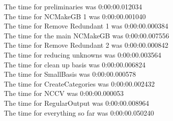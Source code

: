 \documentclass[rep10,leqno]{report}
\begin{document}
\noindent
The time for preliminaries was 0:00:00.012034\\
The time for NCMakeGB 1 was 0:00:00.001040\\
The time for Remove Redundant 1 was 0:00:00.000384\\
The time for the main NCMakeGB was 0:00:00.007556\\
The time for Remove Redundant 2 was 0:00:00.000842\\
The time for reducing unknowns was 0:00:00.003564\\
The time for clean up basis was 0:00:00.006824\\
The time for SmallBasis was 0:00:00.000578\\
The time for CreateCategories was 0:00:00.002432\\
The time for NCCV was 0:00:00.000053\\
The time for RegularOutput was 0:00:00.008964\\
The time for everything so far was 0:00:00.050240\\
\end{document}
